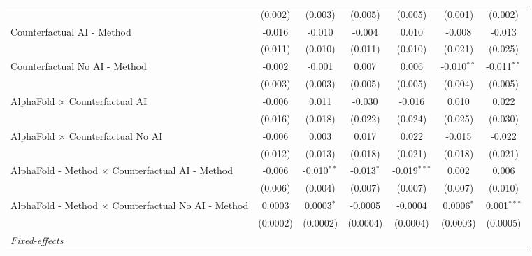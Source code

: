 \begin{tabular}{lcccccc}
                                                              & (0.002)       & (0.003)       & (0.005)      & (0.005)        & (0.001)        & (0.002)\\   
   Counterfactual AI - Method                                 & -0.016        & -0.010        & -0.004       & 0.010          & -0.008         & -0.013\\   
                                                              & (0.011)       & (0.010)       & (0.011)      & (0.010)        & (0.021)        & (0.025)\\   
   Counterfactual No AI - Method                              & -0.002        & -0.001        & 0.007        & 0.006          & -0.010$^{**}$  & -0.011$^{**}$\\   
                                                              & (0.003)       & (0.003)       & (0.005)      & (0.005)        & (0.004)        & (0.005)\\   
   AlphaFold $\times$ Counterfactual AI                       & -0.006        & 0.011         & -0.030       & -0.016         & 0.010          & 0.022\\   
                                                              & (0.016)       & (0.018)       & (0.022)      & (0.024)        & (0.025)        & (0.030)\\   
   AlphaFold $\times$ Counterfactual No AI                    & -0.006        & 0.003         & 0.017        & 0.022          & -0.015         & -0.022\\   
                                                              & (0.012)       & (0.013)       & (0.018)      & (0.021)        & (0.018)        & (0.021)\\   
   AlphaFold - Method $\times$ Counterfactual AI - Method     & -0.006        & -0.010$^{**}$ & -0.013$^{*}$ & -0.019$^{***}$ & 0.002          & 0.006\\   
                                                              & (0.006)       & (0.004)       & (0.007)      & (0.007)        & (0.007)        & (0.010)\\   
   AlphaFold - Method $\times$ Counterfactual No AI - Method  & 0.0003        & 0.0003$^{*}$  & -0.0005      & -0.0004        & 0.0006$^{*}$   & 0.001$^{***}$\\   
                                                              & (0.0002)      & (0.0002)      & (0.0004)     & (0.0004)       & (0.0003)       & (0.0005)\\   
   \midrule
   \emph{Fixed-effects}\\

\end{tabular}
